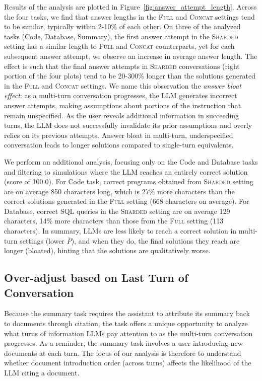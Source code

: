 \documentclass{article}
\newcommand{\fullt}{\textsc{Full}\xspace}
\newcommand{\concatt}{\textsc{Concat}\xspace}
\newcommand{\shardedt}{\textsc{Sharded}\xspace}
\begin{document}
\begin{appendices}
Results of the analysis are plotted in Figure~\ref{fig:answer_attempt_length}. Across the four tasks, we find that answer lengths in the \fullt and \concatt settings tend to be similar, typically within 2-10\% of each other. On three of the analyzed tasks (Code, Database, Summary), the first answer attempt in the \shardedt setting has a similar length to \fullt and \concatt counterparts, yet for each subsequent answer attempt, we observe an increase in average answer length. The effect is such that the final answer attempts in \shardedt conversations (right portion of the four plots) tend to be 20-300\% longer than the solutions generated in the \fullt and \concatt settings. We name this observation the \textit{answer bloat effect}: as a multi-turn conversation progresses, the LLM generates incorrect answer attempts, making assumptions about portions of the instruction that remain unspecified. As the user reveals additional information in succeeding turns, the LLM does not successfully invalidate its prior assumptions and overly relies on its previous attempts. Answer bloat in multi-turn, underspecified conversation leads to longer solutions compared to single-turn equivalents.

We perform an additional analysis, focusing only on the Code and Database tasks and filtering to simulations where the LLM reaches an entirely correct solution (score of 100.0). For Code task, correct programs obtained from \shardedt setting are on average 850 characters long, which is 27\% more characters than the correct solutions generated in the \fullt setting (668 characters on average).
For Database, correct SQL queries in the \shardedt setting are on average 129 characters, 14\% more characters than those from the \fullt setting (113 characters).
In summary, LLMs are less likely to reach a correct solution in multi-turn settings (lower $\overline{P}$), and when they do, the final solutions they reach are longer (bloated), hinting that the solutions are qualitatively worse.

\subsection{Over-adjust based on Last Turn of Conversation} \label{app:summary_last_turn}

Because the summary task requires the assistant to attribute its summary back to documents through citation, the task offers a unique opportunity to analyze what turns of information LLMs pay attention to as the multi-turn conversation progresses. As a reminder, the summary task involves a user introducing new documents at each turn. The focus of our analysis is therefore to understand whether document introduction order (across turns) affects the likelihood of the LLM citing a document.



\end{appendices}
\end{document}
